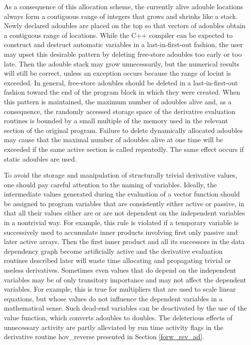 \documentclass[11pt,twoside]{article}
\begin{document}
 As a consequence of this allocation scheme, the currently
alive {\sf adouble} locations always form a contiguous range of integers
that grows and shrinks like a stack. Newly declared {\sf adouble}s are
placed on the top so that vectors of {\sf adouble}s obtain a contiguous
range of locations. While the C++ compiler can be expected to construct
and destruct automatic variables in a last-in-first-out fashion, the
user may upset this desirable pattern by deleting free-store {\sf adouble}s
too early or too late. Then the {\sf adouble} stack may grow
unnecessarily, but the numerical results will still be
correct, unless an exception occurs because the range of {\sf locint}
is exceeded. In general, free-store {\sf adouble}s 
%
%
should be deleted in a last-in-first-out fashion toward the end of
the program block in which they were created.
When this pattern is maintained, the maximum number of
{\sf adouble}s alive and, as a consequence, the
randomly accessed storage space
of the derivative evaluation routines is bounded by a
small multiple of the memory used in the relevant section of the
original program. Failure to delete dynamically allocated {\sf adouble}s
may cause that the  maximal number of {\sf adouble}s alive at one time will be exceeded 
if the same active section is called repeatedly. The same effect
occurs if static {\sf adouble}s are used.

To avoid the storage and manipulation of structurally
trivial derivative values, one should pay careful attention to
the naming of variables. Ideally, the intermediate
values generated during the evaluation of a vector function
should be assigned to program variables that are
consistently either active or passive, in that all their values
either are or are not dependent on the independent variables
in a nontrivial way. For example, this rule is violated if a temporary
variable is successively used to accumulate inner products involving
first only passive and later active arrays. Then the first inner
product and all its successors in the data dependency graph become
artificially active and the derivative evaluation routines
described later will waste
time allocating and propagating
trivial or useless derivatives. Sometimes even values that do
depend on the independent variables may be of only transitory
importance and may not affect the dependent variables. For example,
this is true for multipliers that are used to scale linear
equations, but whose values do not influence the dependent
variables in a mathematical sense. Such dead-end variables
can be deactivated by the use of the {\sf value} function, which
converts {\sf adouble}s to {\sf double}s. The deleterious effects
of unnecessary activity are partly alleviated by run time
activity flags in the derivative routine
{\sf hov\_reverse} presented in Section \ref{forw_rev_ad}.
%
%
%
\end{document}
